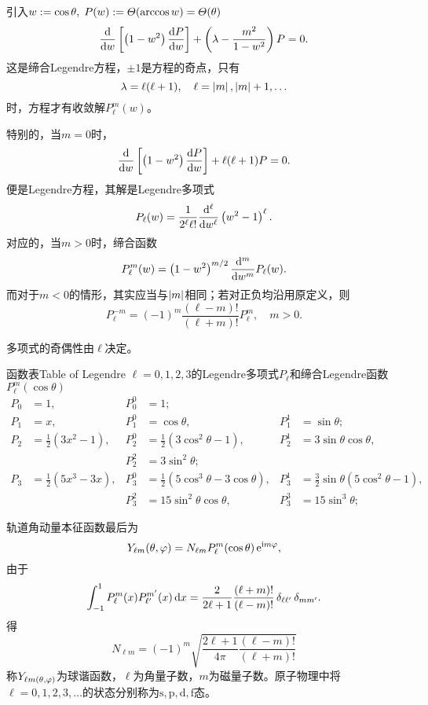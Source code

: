 引入$w:=\cos\ct,\;P(w):=\vC(\arccos w)=\vC(\ct)$
\begin{equation}
	\dd w\fkh{\kh{1-w^2}\dv Pw}+\kh{\lambda-\frac{m^2}{1-w^2}}P=0.
\end{equation}
这是缔合Legendre方程，$\pm 1$是方程的奇点，只有
\[
	\lambda=\ell(\ell+1),\quad\ell=\abs m,\abs m+1,\ldots
\]
时，方程才有收敛解$P_\ell^m(w)$。

特别的，当$m=0$时，
\[
	\dd w\fkh{\kh{1-w^2}\dv Pw}+\ell(\ell+1)P=0.
\]
便是Legendre方程，其解是Legendre多项式
\[
P_\ell(w)=\frac1{2^\ell\ell!}\dd[\ell]w\kh{w^2-1}^\ell.
\]
对应的，当$m>0$时，缔合\Legd 函数
\[
P_\ell^m(w)=\kh{1-w^2}^{m/2}\dd[m]wP_\ell(w).
\]
而对于$m<0$的情形，其实应当与$\abs m$相同；若对正负均沿用原定义，则
\[
P_\ell^{-m}=(-1)^m\frac{(\ell-m)!}{(\ell+m)!}P_\ell^m,\quad m>0.
\]

\Legd 多项式的奇偶性由$\ell$决定。
\begin{example}{\Legd 函数表}{Table of Legendre}
	$\ell=0,1,2,3$的Legendre多项式$P_\ell$和缔合Legendre函数$P_\ell^m(\cos\theta)$%
	\small{\begin{align*}
			P_0 & =1, & P_0^0 & =1;\\
			P_1 & =x, & P_1^0 & =\cos\theta, & P_1^1 & =\sin\theta;\\
			P_2 & =\frac12(3x^2-1), & P_2^0 & =\frac12(3\cos^2\theta-1), & P_2^1 & =3\sin\theta\cos\theta,\\
			    && P_2^2 &=3\sin^2\theta;\\
			P_3 & =\frac12(5x^3-3x), & P_3^0 & =\frac12(5\cos^3\theta-3\cos\theta), & P_3^1 & =\frac32\sin\theta(5\cos^2\theta-1),\\
			    && P_3^2 & =15\sin^2\theta\cos\theta, & P_3^3 & =15\sin^3\theta;
		\end{align*}}
\end{example}
轨道角动量本征函数最后为
\[
	Y_{\ell m}(\ct,\vf)=N_{\ell m}P_\ell^m(\cos\ct)\e{\i m\vf},
\]
由于
\[
	\int_{-1}^1P_\ell^m(x)P_{\ell'}^{m'}(x)\d x=\frac2{2\ell+1}\frac{(\ell+m)!}{(\ell-m)!}\vd_{\ell\ell'}\vd_{mm'}.
\]
得
\[
N_{\ell m}=(-1)^m\sqrt{\frac{2\ell+1}{4\pi}\frac{(\ell-m)!}{(\ell+m)!}}
\]
称$Y_{\ell m(\ct,\vf)}$为球谐函数，$\ell$为角量子数，$m$为磁量子数。原子物理中将$\ell=0,1,2,3,\ldots$的状态分别称为$\mathrm{s,p,d,f}$态。

